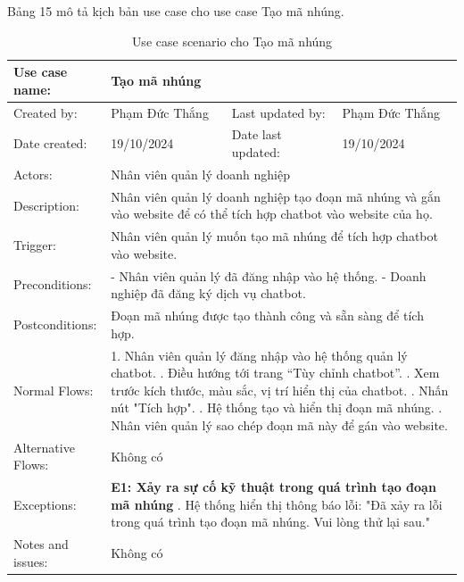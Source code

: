 Bảng 15 mô tả kịch bản use case cho use case Tạo mã nhúng.

\begin{table}[H]
\centering
\begin{tabular}{|l|l|l|l|}
\hline
Use case name: & \multicolumn{3}{|l|}{Tạo mã nhúng} \\
\hline
Created by: & Phạm Đức Thắng & Last updated by: & Phạm Đức Thắng \\
\hline
Date created: & 19/10/2024 & Date last updated: & 19/10/2024 \\
\hline
Actors: & \multicolumn{3}{|l|}{Nhân viên quản lý doanh nghiệp} \\
\hline
Description: & \multicolumn{3}{|p{12cm}|}{Nhân viên quản lý doanh nghiệp tạo đoạn mã nhúng và gắn vào website để có thể tích hợp chatbot vào website của họ.} \\
\hline
Trigger: & \multicolumn{3}{|p{12cm}|}{Nhân viên quản lý muốn tạo mã nhúng để tích hợp chatbot vào website.} \\
\hline
Preconditions: & \multicolumn{3}{|p{12cm}|}{
- Nhân viên quản lý đã đăng nhập vào hệ thống. \newline
- Doanh nghiệp đã đăng ký dịch vụ chatbot.
} \\
\hline
Postconditions: & \multicolumn{3}{|p{12cm}|}{Đoạn mã nhúng được tạo thành công và sẵn sàng để tích hợp.} \\
\hline
Normal Flows: & \multicolumn{3}{|p{12cm}|}{
1. Nhân viên quản lý đăng nhập vào hệ thống quản lý chatbot. \newline
2. Điều hướng tới trang “Tùy chỉnh chatbot”. \newline
3. Xem trước kích thước, màu sắc, vị trí hiển thị của chatbot. \newline
4. Nhấn nút "Tích hợp". \newline
5. Hệ thống tạo và hiển thị đoạn mã nhúng. \newline
6. Nhân viên quản lý sao chép đoạn mã này để gán vào website.
}\\
\hline
Alternative Flows: & \multicolumn{3}{|p{12cm}|}{Không có} \\
\hline
Exceptions: & \multicolumn{3}{|p{12cm}|}{
\textbf{E1: Xảy ra sự cố kỹ thuật trong quá trình tạo đoạn mã nhúng} \newline
5.1. Hệ thống hiển thị thông báo lỗi: "Đã xảy ra lỗi trong quá trình tạo đoạn mã nhúng. Vui lòng thử lại sau."
} \\
\hline
Notes and issues: & \multicolumn{3}{|p{12cm}|}{Không có} \\
\hline
\end{tabular}
\caption{Use case scenario cho Tạo mã nhúng}
\end{table}

